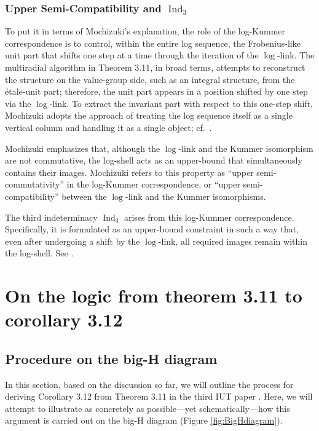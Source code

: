 \documentclass[12pt, reqno, a4paper]{amsart}
\DeclareMathOperator{\Ind}{Ind}
\def\IndThree{\Ind_3}
\begin{document}
\subsubsection{Upper Semi-Compatibility and \(\IndThree\)}\label{subsub:upperSemiComp}
To put it in terms of Mochizuki’s explanation, the role of the log-Kummer correspondence is to control, within the entire log sequence, the Frobenius-like unit part that shifts one step at a time through the iteration of the \(\log\)-link. The multiradial algorithm in Theorem 3.11, in broad terms, attempts to reconstruct the structure on the value-group side, such as an integral structure, from the {\'e}tale-unit part; therefore, the unit part appears in a position shifted by one step via the \(\log\)-link. To extract the invariant part with respect to this one-step shift, Mochizuki adopts the approach of treating the log sequence itself as a single vertical column and handling it as a single object; cf.\ \cite[Introduction, pp.\ 408--410]{MR4225475}.

Mochizuki emphasizes that, although the \(\log\)-link and the Kummer isomorphism are not commutative, the log-shell acts as an upper-bound that simultaneously contains their images. Mochizuki refers to this property as “upper semi-commutativity” in the log-Kummer correspondence, or “upper semi-compatibility” between the \(\log\)-link and the Kummer isomorphisms.

The third indeterminacy \(\IndThree\) arises from this log-Kummer correspondence. Specifically, it is formulated as an upper-bound constraint in such a way that, even after undergoing a shift by the \(\log\)-link, all required images remain within the log-shell. See \cite[Rem.~1.2.2(iii), pp.\ 442--443; Thm.~3.11(ii), pp.\ 575--577]{MR4225475}.



\setcounter{equation}{0}
\section{On the logic from theorem 3.11 to corollary 3.12}\label{sec:from3.11To3.12}

\subsection{Procedure on the big-H diagram}\label{sub:procedureOnBigH}
In this section, based on the discussion so far, we will outline the process for deriving Corollary 3.12 from Theorem 3.11 in the third IUT paper \cite{MR4225475}. Here, we will attempt to illustrate as concretely as possible---yet schematically---how this argument is carried out on the big-H diagram (Figure \ref{fig:BigHdiagram}).
\end{document}
